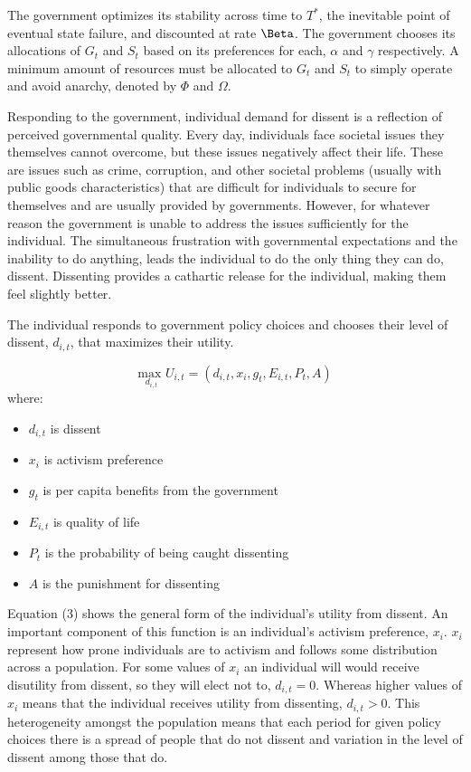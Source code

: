 \documentclass[12pt]{article}
\begin{document}
\begin{spacing}{1.5}
The government optimizes its stability across time to $T^*$, the inevitable point of eventual state failure, and discounted at rate $\Beta$. The government chooses its allocations of $G_t$ and $S_t$ based on its preferences for each, $\alpha$ and $\gamma$ respectively. A minimum amount of resources must be allocated to $G_t$ and $S_t$ to simply operate and avoid anarchy, denoted by $\Phi$ and $\Omega$. 

Responding to the government, individual demand for dissent is a reflection of perceived governmental quality. Every day, individuals face societal issues they themselves cannot overcome, but these issues negatively affect their life. These are issues such as crime, corruption, and other societal problems (usually with public goods characteristics) that are difficult for individuals to secure for themselves and are usually provided by governments. However, for  whatever reason the government is unable to address the issues sufficiently for the individual. The simultaneous frustration with governmental expectations and the inability to do anything, leads the individual to do the only thing they can do, dissent. Dissenting provides a cathartic release for the individual, making them feel slightly better.

The individual responds to government policy choices and chooses their level of dissent, $d_{i,t}$, that maximizes their utility.  

\vspace{.5 em}
\begin{equation}
{\underset{d_{i,t}}{\text{max }}}  U_{i,t}= (d_{i,t},x_i,g_t, E_{i,t},P_t, A)
\end{equation}
where: 
\begin{spacing}{1}
\begin{itemize}
\item $d_{i,t}$ is dissent
\item $x_i$ is activism preference 
\item $g_t$ is per capita benefits from the government 
\item $E_{i,t}$ is quality of life  
\item $P_t$ is the probability of being caught dissenting
\item $A$ is the punishment for dissenting	
\end{itemize}
\end{spacing}

Equation (3) shows the general form of the individual's utility from dissent. An important component of this function is an individual's activism preference, $x_i$. $x_i$ represent how prone individuals are to activism and follows some distribution across a population. For some values of $x_i$ an individual will would receive disutility from dissent, so they will elect not to, $d_{i,t}=0$. Whereas higher values of $x_i$ means that the individual receives utility from dissenting, $d_{i,t}>0$. This heterogeneity amongst the population means that each period for given policy choices there is a spread of people that do not dissent and variation in the level of dissent among those that do.  


\end{spacing}
\end{document}
